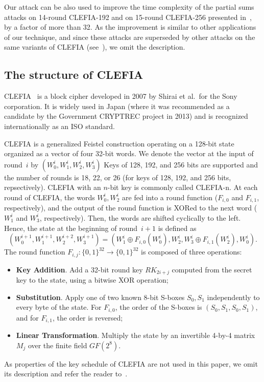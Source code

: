 Our attack can be also used to improve the time complexity of the partial sums attacks on 14-round CLEFIA-192 and on 15-round CLEFIA-256 presented in~\cite{SAC:BGWWC13,CISC:YiWCL16}, by a factor of more than 32. As the improvement is similar to other applications of our technique, and since these attacks are superseded by other attacks on the same variants of CLEFIA (see~\cite{JOC:BouraLNS18,FSE:LiJWD15}), we omit the description.  

\subsection{The structure of CLEFIA} 

CLEFIA~\cite{FSE:ShiraiSAMI07} is a block cipher developed in 2007 by Shirai et al.~for the Sony corporation. It is widely used in Japan (where it was recommended as a candidate by the Government CRYPTREC project in 2013) and is recognized internationally as an ISO standard.

CLEFIA is a generalized Feistel construction operating on a 128-bit state organized as a vector of four 32-bit words. We denote the vector at the input of round~$i$ by $(W^i_0,W^i_1,W^i_2,W^i_3)$  Keys of 128, 192, and 256 bits are supported and the number of rounds is 18, 22, or 26 (for keys of 128, 192, and 256 bits, repsectively). CLEFIA with an $n$-bit key is commonly called CLEFIA-n. At each round of CLEFIA, the words $W^i_0,W^i_2$ are fed into a round function ($F_{i,0}$ and $F_{i,1}$, respectively), and the output of the round function is XORed to the next word ($W^i_1$ and $W^i_3$, respectively). Then, the words are shifted cyclically to the left. Hence, the state at the beginning of round~$i+1$ is defined as
$$
(W^{i+1}_0,W^{i+1}_1,W^{i+2}_2,W^{i+1}_3) = (W^i_1 \oplus F_{i,0}(W^i_0), W^i_2, W^i_3 \oplus F_{i,1}(W^i_2), W^i_0). 
$$
The round function $F_{i,j}:\{0,1\}^{32} \to \{0,1\}^{32}$ is composed of three operations:
\begin{itemize} 
    \item[] \textbf{Key Addition}. Add a 32-bit round key $RK_{2i+j}$ computed from the secret key to the state, using a bitwise XOR operation;
    \item[] \textbf{Substitution}. Apply one of two known 8-bit S-boxes $S_0,S_1$ independently to every byte of the state. For $F_{i,0}$, the order of the S-boxes is $(S_0,S_1,S_0,S_1)$, and for $F_{i,1}$, the order is reversed; 
    \item[] \textbf{Linear Transformation}. Multiply the state by an invertible 4-by-4 matrix $M_j$ over the finite field $GF(2^8)$.
\end{itemize}
As properties of the key schedule of CLEFIA are not used in this paper, we omit its description and refer the reader to~\cite{FSE:ShiraiSAMI07}.

